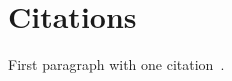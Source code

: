 \documentclass[src/tex/main.tex]{subfiles}
\begin{document}
\section{Citations}

First paragraph with one citation~\cite{mycite}.
\end{document}
